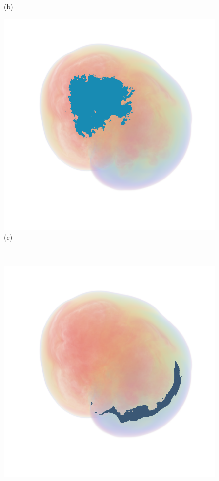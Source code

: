 \documentclass[twoside,twocolumn,10pt]{article}
\begin{document}
\begin{figure}
\begin{minipage}{.16\textwidth}
		(b)
	\end{minipage}
	\begin{minipage}{.16\textwidth}
		\centering
		\includegraphics[width=1\linewidth]{crop/supernova_segment_red}
		(c)
	\end{minipage}~
	\begin{minipage}{.16\textwidth}
		\centering
		\includegraphics[width=1\linewidth]{crop/supernova_segment_green}

\end{minipage}
\end{figure}
\end{document}
